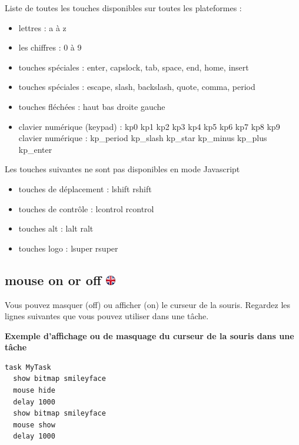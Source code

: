 \documentclass[
]{book}
\providecommand{\tightlist}{%
  \setlength{\itemsep}{0pt}\setlength{\parskip}{0pt}}
\begin{document}
Liste de toutes les touches disponibles sur toutes les plateformes :

\begin{itemize}
\tightlist
\item
  lettres : a à z
\item
  les chiffres : 0 à 9
\item
  touches spéciales : enter, capslock, tab, space, end, home, insert
\item
  touches spéciales : escape, slash, backslash, quote, comma, period
\item
  touches fléchées : haut bas droite gauche
\item
  clavier numérique (keypad) : kp0 kp1 kp2 kp3 kp4 kp5 kp6 kp7 kp8 kp9
  clavier numérique : kp\_period kp\_slash kp\_star kp\_minus kp\_plus kp\_enter
\end{itemize}

Les touches suivantes ne sont pas disponibles en mode Javascript

\begin{itemize}
\tightlist
\item
  touches de déplacement : lshift rshift
\item
  touches de contrôle : lcontrol rcontrol
\item
  touches alt : lalt ralt
\item
  touches logo : lsuper rsuper
\end{itemize}

\hypertarget{mouse-on-or-off}{%
\subsection[mouse on or off ]{\texorpdfstring{mouse on or off \href{https://www.psytoolkit.org/doc3.2.0/syntax.html\#task-mouse}{\protect\includegraphics{img/ukflag.png}}}{mouse on or off }}\label{mouse-on-or-off}}

Vous pouvez masquer (off) ou afficher (on) le curseur de la souris. Regardez les lignes suivantes que vous pouvez utiliser dans une tâche.

\textbf{Exemple d'affichage ou de masquage du curseur de la souris dans une tâche}

\begin{verbatim}
task MyTask
  show bitmap smileyface
  mouse hide
  delay 1000
  show bitmap smileyface
  mouse show
  delay 1000
\end{verbatim}
\end{document}
